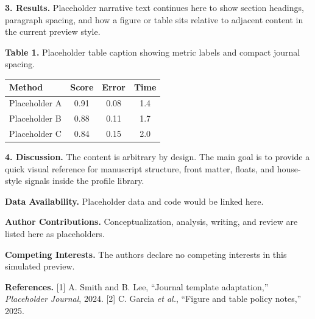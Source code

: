 \documentclass[10pt,a4paper]{article}
\begin{document}
\textbf{3. Results.} Placeholder narrative text continues here to show section headings, paragraph spacing, and how a figure or table sits relative to adjacent content in the current preview style.

\noindent\textbf{Table 1.} Placeholder table caption showing metric labels and compact journal spacing.\par\begin{center}
\begin{tabular}{lccc}
\toprule
Method & Score & Error & Time\\
\midrule
Placeholder A & 0.91 & 0.08 & 1.4\\
Placeholder B & 0.88 & 0.11 & 1.7\\
Placeholder C & 0.84 & 0.15 & 2.0\\
\bottomrule
\end{tabular}\end{center}\vspace{0.5em}

\textbf{4. Discussion.} The content is arbitrary by design. The main goal is to provide a quick visual reference for manuscript structure, front matter, floats, and house-style signals inside the profile library.


\noindent \textbf{Data Availability.} Placeholder data and code would be linked here.\par
\noindent \textbf{Author Contributions.} Conceptualization, analysis, writing, and review are listed here as placeholders.\par
\noindent \textbf{Competing Interests.} The authors declare no competing interests in this simulated preview.\par
\vspace{0.5em}
\noindent \textbf{References.} [1] A. Smith and B. Lee, ``Journal template adaptation,'' \textit{Placeholder Journal}, 2024. [2] C. Garcia \textit{et al.}, ``Figure and table policy notes,'' 2025.\par
\vspace{0.6em}
\end{document}

